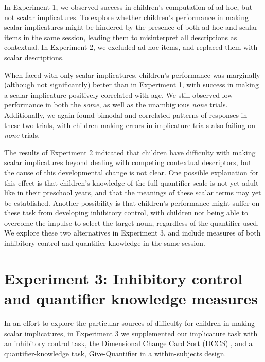 \documentclass[man]{apa2}
\begin{document}
In Experiment 1, we observed success in children's computation of ad-hoc, but not scalar implicatures. To explore whether children's performance in making scalar implicatures might be hindered by the presence of both ad-hoc and scalar items in the same session, leading them to misinterpret all descriptions as contextual. In Experiment 2, we excluded ad-hoc items, and replaced them with scalar descriptions. 

When faced with only scalar implicatures, children's performance was marginally (although not significantly) better than in Experiment 1, with success in making a scalar implicature positively correlated with age. We still observed low performance in both the \textit{some}, as well as the unambiguous \textit{none} trials. Additionally, we again found bimodal and correlated patterns of responses in these two trials, with children making errors in implicature trials also failing on \textit{none} trials. 

The results of Experiment 2 indicated that children have difficulty with making scalar implicatures beyond dealing with competing contextual descriptors, but the cause of this developmental change is not clear. One possible explanation for this effect is that children's knowledge of the full quantifier scale is not yet adult-like in their preschool years, and that the meanings of these scalar terms may yet be established. Another possibility is that children's performance might suffer on these task from developing inhibitory control, with children not being able to overcome the impulse to select the target noun, regardless of the quantifier used. We explore these two alternatives in Experiment 3, and include measures of both inhibitory control and quantifier knowledge in the same session. 

				
\section{Experiment 3: Inhibitory control and quantifier knowledge measures}

In an effort to explore the particular sources of difficulty for children in making scalar implicatures, in Experiment 3 we supplemented our implicature task with an inhibitory control task, the Dimensional Change Card Sort (DCCS) \cite{zelazo2006}, and a quantifier-knowledge task, Give-Quantifier \cite{barner2009} in a within-subjects design.  
\end{document}

